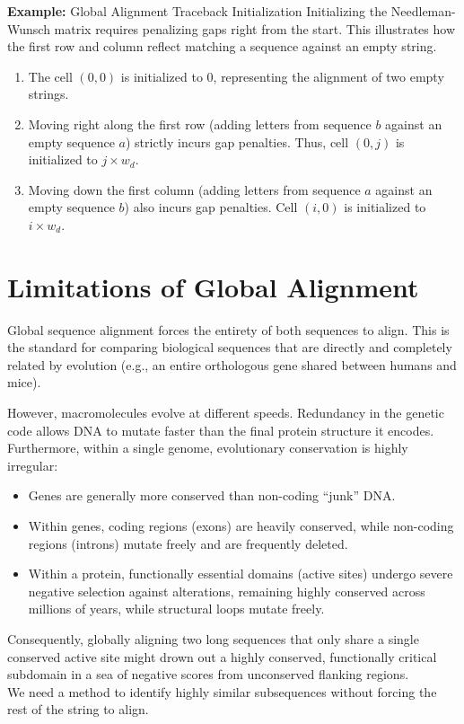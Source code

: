 
\textbf{Example:} Global Alignment Traceback Initialization
Initializing the Needleman-Wunsch matrix requires penalizing gaps right from the start. This illustrates how the first row and column reflect matching a sequence against an empty string.
\begin{enumerate}
    \item The cell $(0,0)$ is initialized to $0$, representing the alignment of two empty strings.
    \item Moving right along the first row (adding letters from sequence $b$ against an empty sequence $a$) strictly incurs gap penalties. Thus, cell $(0, j)$ is initialized to $j \times w_d$.
    \item Moving down the first column (adding letters from sequence $a$ against an empty sequence $b$) also incurs gap penalties. Cell $(i, 0)$ is initialized to $i \times w_d$.
\end{enumerate}

\section{Limitations of Global Alignment}
Global sequence alignment forces the entirety of both sequences to align. This is the standard for comparing biological sequences that are directly and completely related by evolution (e.g., an entire orthologous gene shared between humans and mice). 

However, macromolecules evolve at different speeds. Redundancy in the genetic code allows DNA to mutate faster than the final protein structure it encodes. Furthermore, within a single genome, evolutionary conservation is highly irregular:
\begin{itemize}
    \item Genes are generally more conserved than non-coding ``junk'' DNA.
    \item Within genes, coding regions (exons) are heavily conserved, while non-coding regions (introns) mutate freely and are frequently deleted.
    \item Within a protein, functionally essential domains (active sites) undergo severe negative selection against alterations, remaining highly conserved across millions of years, while structural loops mutate freely.
\end{itemize}
Consequently, globally aligning two long sequences that only share a single conserved active site might drown out a highly conserved, functionally critical subdomain in a sea of negative scores from unconserved flanking regions. \\
\sta We need a method to identify highly similar subsequences without forcing the rest of the string to align.

